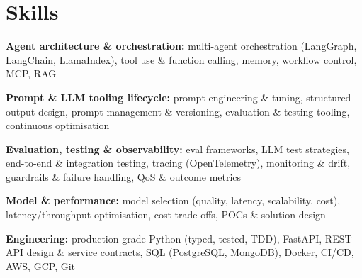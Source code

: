 \documentclass[10pt,a4paper]{article}
\begin{document}
\section{Skills}
\begin{tight}
  \item[\textcolor{accent}{\small$\bullet$}] \textbf{Agent architecture \& orchestration:} multi-agent orchestration (LangGraph, LangChain, LlamaIndex), tool use \& function calling, memory, workflow control, MCP, RAG
  \item[\textcolor{accent}{\small$\bullet$}] \textbf{Prompt \& LLM tooling lifecycle:} prompt engineering \& tuning, structured output design, prompt management \& versioning, evaluation \& testing tooling, continuous optimisation
  \item[\textcolor{accent}{\small$\bullet$}] \textbf{Evaluation, testing \& observability:} eval frameworks, LLM test strategies, end-to-end \& integration testing, tracing (OpenTelemetry), monitoring \& drift, guardrails \& failure handling, QoS \& outcome metrics
  \item[\textcolor{accent}{\small$\bullet$}] \textbf{Model \& performance:} model selection (quality, latency, scalability, cost), latency/throughput optimisation, cost trade-offs, POCs \& solution design
  \item[\textcolor{accent}{\small$\bullet$}] \textbf{Engineering:} production-grade Python (typed, tested, TDD), FastAPI, REST API design \& service contracts, SQL (PostgreSQL, MongoDB), Docker, CI/CD, AWS, GCP, Git
\end{tight}

\end{document}
